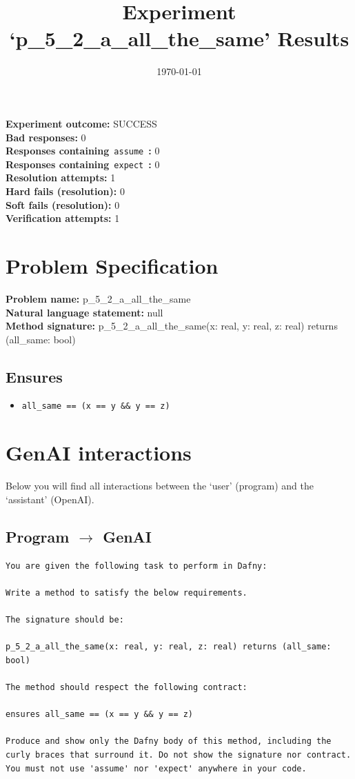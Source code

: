 \documentclass{article}
\begin{document}
\title{Experiment `p\_5\_2\_a\_all\_the\_same' Results}
\author{\today}
\date{}
\maketitle
\textbf{Experiment outcome: }SUCCESS
\\\textbf{Bad responses: }0
\\\textbf{Responses containing}~\texttt{assume}~\textbf{: }0
\\\textbf{Responses containing}~\texttt{expect}~\textbf{: }0
\\\textbf{Resolution attempts: }1
\\\textbf{Hard fails (resolution): }0
\\\textbf{Soft fails (resolution): }0
\\\textbf{Verification attempts: }1
\section*{Problem Specification}
\textbf{Problem name: }p\_5\_2\_a\_all\_the\_same
\\\textbf{Natural language statement: }null
\\\textbf{Method signature: }p\_5\_2\_a\_all\_the\_same(x: real, y: real, z: real) returns (all\_same: bool)
\subsection*{Ensures}
\begin{itemize}
\item \texttt{all\_same == (x == y \&\& y == z)}
\end{itemize}
\clearpage
\section*{GenAI interactions}
Below you will find all interactions between the `user' (program) and the `assistant' (OpenAI).
\subsection*{Program $\rightarrow$ GenAI}
\begin{lstlisting}
You are given the following task to perform in Dafny:

Write a method to satisfy the below requirements.

The signature should be:

p_5_2_a_all_the_same(x: real, y: real, z: real) returns (all_same: bool)

The method should respect the following contract:

ensures all_same == (x == y && y == z)

Produce and show only the Dafny body of this method, including the curly braces that surround it. Do not show the signature nor contract. You must not use 'assume' nor 'expect' anywhere in your code.
\end{lstlisting}
\end{document}
